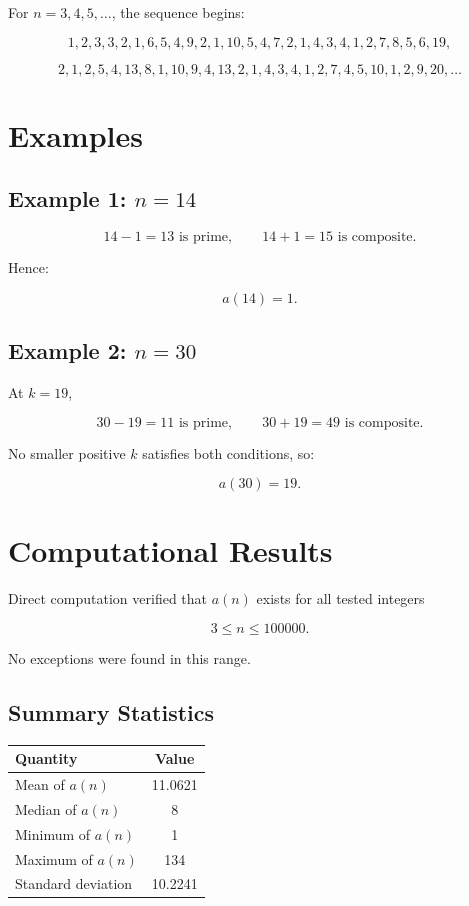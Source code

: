 \documentclass[11pt,a4paper]{article}
\begin{document}
For \(n=3,4,5,\dots\), the sequence begins:

\[
1,2,3,3,2,1,6,5,4,9,2,1,10,5,4,7,2,1,4,3,4,1,2,7,8,5,6,19,
\]

\[
2,1,2,5,4,13,8,1,10,9,4,13,2,1,4,3,4,1,2,7,4,5,10,1,2,9,20,\dots
\]

\section{Examples}

\subsection*{Example 1: \(n=14\)}

\[
14-1=13 \text{ is prime}, \qquad 14+1=15 \text{ is composite}.
\]

Hence:

\[
a(14)=1.
\]

\subsection*{Example 2: \(n=30\)}

At \(k=19\),

\[
30-19=11 \text{ is prime}, \qquad 30+19=49 \text{ is composite}.
\]

No smaller positive \(k\) satisfies both conditions, so:

\[
a(30)=19.
\]

\section{Computational Results}

Direct computation verified that \(a(n)\) exists for all tested integers

\[
3 \le n \le 100000.
\]

No exceptions were found in this range.

\subsection*{Summary Statistics}

\begin{center}
\begin{tabular}{lc}
\toprule
Quantity & Value \\
\midrule
Mean of \(a(n)\) & 11.0621 \\
Median of \(a(n)\) & 8 \\
Minimum of \(a(n)\) & 1 \\
Maximum of \(a(n)\) & 134 \\
Standard deviation & 10.2241 \\
\bottomrule
\end{tabular}
\end{center}
\end{document}
